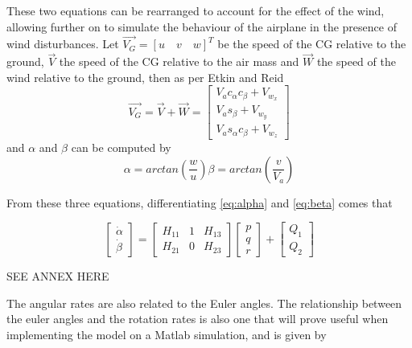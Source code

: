 These two equations can be rearranged to account for the effect of the wind, allowing further on to simulate the behaviour of the airplane in the presence of wind disturbances. Let $\vec{V_G} = [u \quad v \quad w]^T$ be the speed of the CG relative to the ground, $\vec{V}$ the speed of the CG relative to the air mass and $\vec{W}$ the speed of the wind relative to the ground, then as per Etkin and Reid \cite{Etkin+Reid} 
\begin{equation}
\vec{V_G} = \vec{V} + \vec{W} = 
\begin{bmatrix}
V_ac_\alpha c_\beta + V_{w_x}\\
V_as_\beta+V_{w_y}\\
V_as_\alpha c_\beta + V_{w_z}
\end{bmatrix}
\label{eq:windtriangle}
\end{equation}
and $\alpha$ and $\beta$ can be computed by 
\begin{subequations}
	\begin{equation}
		\alpha = arctan\left(\dfrac{w}{u}\right)
		\label{eq:alpha}
	\end{equation}
	\begin{equation}
		\beta = arctan\left(\dfrac{v}{V_a}\right)
		\label{eq:beta}
	\end{equation}
\end{subequations}

From these three equations, differentiating \ref{eq:alpha} and \ref{eq:beta} comes that 

\begin{equation}
\begin{bmatrix}
\dot{\alpha}\\
\dot{\beta}
\end{bmatrix}
= 
\begin{bmatrix}
H_{11} & 1 & H_{13}\\
H_{21} & 0 & H_{23}
\end{bmatrix}
\begin{bmatrix}
p\\
q\\
r
\end{bmatrix}
+
\begin{bmatrix}
Q_1\\
Q_2
\end{bmatrix}
\label{eq:alphabetadot}
\end{equation}

SEE ANNEX HERE

The angular rates are also related to the Euler angles. The relationship between the euler angles and the rotation rates is also one that will prove useful when implementing the model on a Matlab simulation, and is given by

